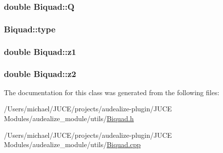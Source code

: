 \subsubsection[{\texorpdfstring{Q}{Q}}]{\setlength{\rightskip}{0pt plus 5cm}double Biquad\+::Q\hspace{0.3cm}{\ttfamily [protected]}}\hypertarget{class_biquad_a7127af163ead5c37a030d97a5671e407}{}\label{class_biquad_a7127af163ead5c37a030d97a5671e407}
\subsubsection[{\texorpdfstring{type}{type}}]{ Biquad\+::type\hspace{0.3cm}{\ttfamily [protected]}}\hypertarget{class_biquad_adc7cf1c0aa8f3cb9287e686e35e8fdfb}{}\label{class_biquad_adc7cf1c0aa8f3cb9287e686e35e8fdfb}
\subsubsection[{\texorpdfstring{z1}{z1}}]{\setlength{\rightskip}{0pt plus 5cm}double Biquad\+::z1\hspace{0.3cm}{\ttfamily [protected]}}\hypertarget{class_biquad_abe704b2b7ed691ca061cd3fac1cf52c9}{}\label{class_biquad_abe704b2b7ed691ca061cd3fac1cf52c9}
\subsubsection[{\texorpdfstring{z2}{z2}}]{\setlength{\rightskip}{0pt plus 5cm}double Biquad\+::z2\hspace{0.3cm}{\ttfamily [protected]}}\hypertarget{class_biquad_a9ff7a9ffd22d135eda519b9fb5950d38}{}\label{class_biquad_a9ff7a9ffd22d135eda519b9fb5950d38}


The documentation for this class was generated from the following files\+:\begin{DoxyCompactItemize}
\item 
/\+Users/michael/\+J\+U\+C\+E/projects/audealize-\/plugin/\+J\+U\+C\+E Modules/audealize\+\_\+module/utils/\hyperlink{_biquad_8h}{Biquad.\+h}\item 
/\+Users/michael/\+J\+U\+C\+E/projects/audealize-\/plugin/\+J\+U\+C\+E Modules/audealize\+\_\+module/utils/\hyperlink{_biquad_8cpp}{Biquad.\+cpp}\end{DoxyCompactItemize}
